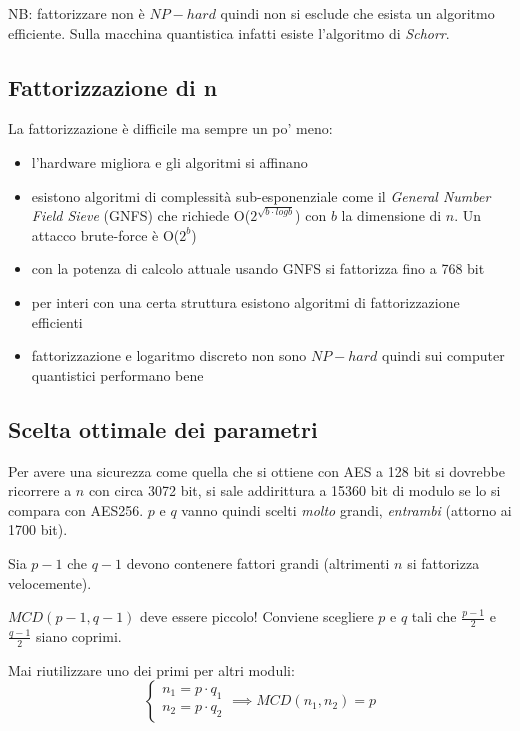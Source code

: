 NB: fattorizzare non è $NP-hard$ quindi non si esclude che esista un algoritmo efficiente. Sulla macchina quantistica infatti esiste l'algoritmo di \emph{Schorr}.

\clearpage

\subsection{Fattorizzazione di n}
La fattorizzazione è difficile ma sempre un po' meno:
\begin{itemize}
    \item l'hardware migliora e gli algoritmi si affinano
    \item esistono algoritmi di complessità sub-esponenziale come il \emph{General Number Field Sieve} (GNFS) che richiede O($2^{\sqrt{b \cdot log b}}$) con $b$ la dimensione di $n$. Un attacco brute-force è O($2^b$)
    \item con la potenza di calcolo attuale usando GNFS si fattorizza fino a 768 bit
    \item per interi con una certa struttura esistono algoritmi di fattorizzazione efficienti
    \item fattorizzazione e logaritmo discreto non sono $NP-hard$ quindi sui computer quantistici performano bene
\end{itemize}

\subsection{Scelta ottimale dei parametri}
Per avere una sicurezza come quella che si ottiene con AES a 128 bit si dovrebbe ricorrere a $n$ con circa 3072 bit, si sale addirittura a 15360 bit di modulo se lo si compara con AES256.
$p$ e $q$ vanno quindi scelti \emph{molto} grandi, \emph{entrambi} (attorno ai 1700 bit).

Sia $p-1$ che $q-1$ devono contenere fattori grandi (altrimenti $n$ si fattorizza velocemente).

$MCD(p-1, q-1)$ deve essere piccolo! Conviene scegliere $p$ e $q$ tali che $\frac{p-1}{2}$ e $\frac{q-1}{2}$ siano coprimi.

Mai riutilizzare uno dei primi per altri moduli:
\begin{equation}
    \begin{cases}
    n_1 = p \cdot q_1 \\
    n_2 = p \cdot q_2
    \end{cases}
    \implies MCD(n_1, n_2) = p
\end{equation}

